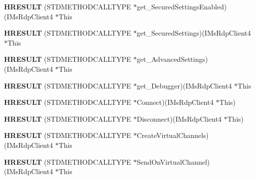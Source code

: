 \begin{DoxyCompactItemize}
\mbox{\label{struct_i_ms_rdp_client4_vtbl_af5658d4e3391334d0b44960d1074b371}} 
{\bfseries H\+R\+E\+S\+U\+LT} (S\+T\+D\+M\+E\+T\+H\+O\+D\+C\+A\+L\+L\+T\+Y\+PE $\ast$get\+\_\+\+Secured\+Settings\+Enabled)(I\+Ms\+Rdp\+Client4 $\ast$This
\item 
\mbox{\label{struct_i_ms_rdp_client4_vtbl_ac23c580029867b74dc8682eb7f81a68e}} 
{\bfseries H\+R\+E\+S\+U\+LT} (S\+T\+D\+M\+E\+T\+H\+O\+D\+C\+A\+L\+L\+T\+Y\+PE $\ast$get\+\_\+\+Secured\+Settings)(I\+Ms\+Rdp\+Client4 $\ast$This
\item 
\mbox{\label{struct_i_ms_rdp_client4_vtbl_a5dce2262419c4fd0b4bf4e35de40142c}} 
{\bfseries H\+R\+E\+S\+U\+LT} (S\+T\+D\+M\+E\+T\+H\+O\+D\+C\+A\+L\+L\+T\+Y\+PE $\ast$get\+\_\+\+Advanced\+Settings)(I\+Ms\+Rdp\+Client4 $\ast$This
\item 
\mbox{\label{struct_i_ms_rdp_client4_vtbl_aef4f3e95b40a781ca677d7fd9153c3e0}} 
{\bfseries H\+R\+E\+S\+U\+LT} (S\+T\+D\+M\+E\+T\+H\+O\+D\+C\+A\+L\+L\+T\+Y\+PE $\ast$get\+\_\+\+Debugger)(I\+Ms\+Rdp\+Client4 $\ast$This
\item 
\mbox{\label{struct_i_ms_rdp_client4_vtbl_aaa89f698bb7e0b6812652c3681648c94}} 
{\bfseries H\+R\+E\+S\+U\+LT} (S\+T\+D\+M\+E\+T\+H\+O\+D\+C\+A\+L\+L\+T\+Y\+PE $\ast$Connect)(I\+Ms\+Rdp\+Client4 $\ast$This)
\item 
\mbox{\label{struct_i_ms_rdp_client4_vtbl_ae7fd2b4f05ad1a195fd72b654a2e29ab}} 
{\bfseries H\+R\+E\+S\+U\+LT} (S\+T\+D\+M\+E\+T\+H\+O\+D\+C\+A\+L\+L\+T\+Y\+PE $\ast$Disconnect)(I\+Ms\+Rdp\+Client4 $\ast$This)
\item 
\mbox{\label{struct_i_ms_rdp_client4_vtbl_a6b8e2e4cc807cf6876fddbda946935c2}} 
{\bfseries H\+R\+E\+S\+U\+LT} (S\+T\+D\+M\+E\+T\+H\+O\+D\+C\+A\+L\+L\+T\+Y\+PE $\ast$Create\+Virtual\+Channels)(I\+Ms\+Rdp\+Client4 $\ast$This
\item 
\mbox{\label{struct_i_ms_rdp_client4_vtbl_a6a4327f2c8cbd57c15d9a77b479ce2eb}} 
{\bfseries H\+R\+E\+S\+U\+LT} (S\+T\+D\+M\+E\+T\+H\+O\+D\+C\+A\+L\+L\+T\+Y\+PE $\ast$Send\+On\+Virtual\+Channel)(I\+Ms\+Rdp\+Client4 $\ast$This

\end{DoxyCompactItemize}
